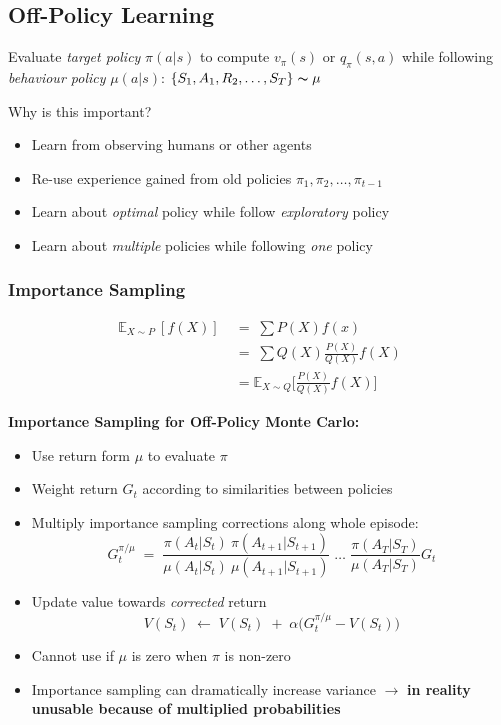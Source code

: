 \documentclass[10pt]{article}
\begin{document}
\newpage
\subsection{Off-Policy Learning}

Evaluate \textit{target policy} $\pi(a|s)$ to compute $v_{\pi}(s)$ or $q_{\pi}(s, a)$ while following \textit{behaviour policy} $\mu (a|s)$: $\{S_{1}, A_{1}, R_{2}, \ldots, S_{T}\} \thicksim \mu$ \newline

Why is this important?
\begin{itemize}
\item Learn from observing humans or other agents
\item Re-use experience gained from old policies $\pi_{1}, \pi_{2}, \dots, \pi_{t-1}$
\item Learn about \textit{optimal} policy while follow \textit{exploratory} policy
\item Learn about \textit{multiple} policies while following \textit{one} policy
\end{itemize}

\subsubsection*{Importance Sampling}
\begin{align*}
\mathbb{E}_{X \sim P} \: [f(X)] \; &= \; \sum P(X) f(x) \\
&= \; \sum Q(X) \frac{P(X)}{Q(X)} f(X) \\
&= \mathbb{E}_{X \sim Q} \Bigg[ \frac{P(X)}{Q(X)} f(X) \Bigg]
\end{align*}

\textbf{Importance Sampling for Off-Policy Monte Carlo:}
\begin{itemize}
\item Use return form $\mu$ to evaluate $\pi$
\item Weight return $G_{t}$ according to similarities between policies
\item Multiply importance sampling corrections along whole episode: \\
\begin{equation}
G_{t}^{\pi / \mu} \; = \; \frac{\pi(A_{t} | S_{t}) \: \pi(A_{t+1} | S_{t+1})}{\mu(A_{t} | S_{t}) \: \mu(A_{t+1} | S_{t+1})} \; \ldots  \; \frac{\pi(A_{T} | S_{T})}{\mu(A_{T} | S_{T})} G_{t}
\end{equation}
\item Update value towards \textit{corrected} return
\begin{equation}
V(S_{t}) \; \leftarrow \; V(S_{t}) \; + \; \alpha \Big( G_{t}^{\pi / \mu} - V(S_{t}) \Big)
\end{equation}
\item Cannot use if $\mu$ is zero when $\pi$ is non-zero
\item Importance sampling can dramatically increase variance \newline $\rightarrow$ \textbf{in reality unusable because of multiplied probabilities}
\end{itemize}
\end{document}
